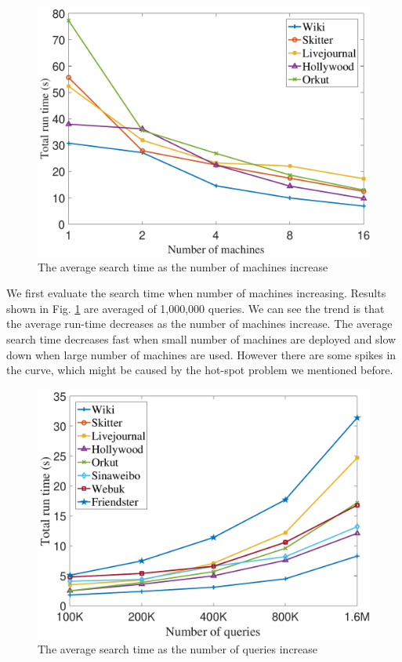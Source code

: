 \begin{figure}[t]
    \centering
    \includegraphics[width=\linewidth]{../figures/scale_machine.pdf}
    \caption{The average search time as the number of machines increase}
    \label{fig:scale_machine}
\end{figure}

We first evaluate the search time when number of machines increasing. Results shown in Fig. \ref{fig:scale_machine} are averaged of 1,000,000 queries. We can see the trend is that the average run-time decreases as the number of machines increase. The average search time decreases fast when small number of machines are deployed and slow down when large number of machines are used. However there are some spikes in the curve, which might be caused by the hot-spot problem we mentioned before.

\begin{figure}[t]
    \centering
    \includegraphics[width=\linewidth]{../figures/scale_query.pdf}
    \caption{The average search time as the number of queries increase}
    \label{fig:scale_query}
\end{figure}


